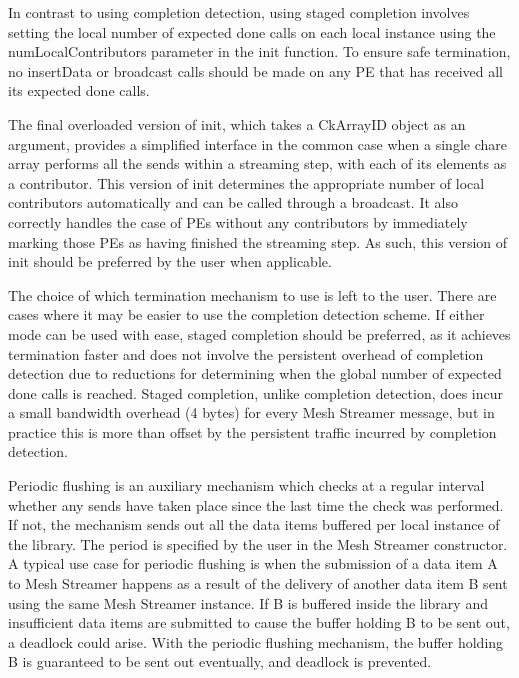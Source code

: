 In contrast to using completion detection, using staged completion
involves setting the local number of expected done calls on each local
instance using the numLocalContributors parameter in the init
function. To ensure safe termination, no insertData or broadcast calls
should be made on any PE that has received all its expected done
calls. 

The final overloaded version of init, which takes a CkArrayID object as an
argument, provides a simplified interface in the common case when a
single chare array performs all the sends within a streaming step,
with each of its elements as a contributor. This version of init
determines the appropriate number of local contributors automatically
and can be called through a broadcast. It also correctly handles
the case of PEs without any contributors by immediately marking those
PEs as having finished the streaming step. As such, this version of init
should be preferred by the user when applicable. 

The choice of which termination mechanism to use is left to the
user. There are cases where it may be easier to use the completion
detection scheme. If either mode can be used with ease, staged
completion should be preferred, as it achieves termination faster and
does not involve the persistent overhead of completion detection due
to reductions for determining when the global number of expected done
calls is reached. Staged completion, unlike completion detection, does
incur a small bandwidth overhead (4 bytes) for every Mesh Streamer
message, but in practice this is more than offset by the persistent
traffic incurred by completion detection. 

Periodic flushing is an auxiliary mechanism which checks at a regular
interval whether any sends have taken place since the last time the
check was performed. If not, the mechanism sends out all the data
items buffered per local instance of the library. The period is
specified by the user in the Mesh Streamer constructor. A typical use case
for periodic flushing is when the submission of a data item A to
Mesh Streamer happens as a result of the delivery of another data item B
sent using the same Mesh Streamer instance. If B is buffered inside the library
and insufficient data items are submitted to cause the buffer holding
B to be sent out, a deadlock could arise. With the periodic flushing
mechanism, the buffer holding B is guaranteed to be sent out
eventually, and deadlock is prevented.




